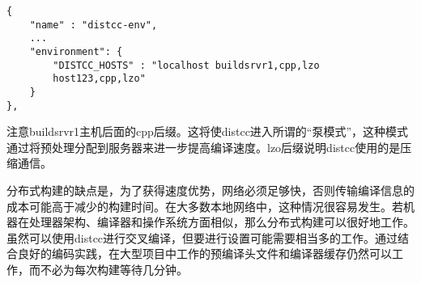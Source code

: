 \begin{lstlisting}[style=styleCMake]
{
	"name" : "distcc-env",
	...
	"environment": {
		"DISTCC_HOSTS" : "localhost buildsrvr1,cpp,lzo
		host123,cpp,lzo"
	}
},
\end{lstlisting}

注意buildsrvr1主机后面的cpp后缀。这将使distcc进入所谓的“泵模式”，这种模式通过将预处理分配到服务器来进一步提高编译速度。lzo后缀说明distcc使用的是压缩通信。

分布式构建的缺点是，为了获得速度优势，网络必须足够快，否则传输编译信息的成本可能高于减少的构建时间。在大多数本地网络中，这种情况很容易发生。若机器在处理器架构、编译器和操作系统方面相似，那么分布式构建可以很好地工作。虽然可以使用distcc进行交叉编译，但要进行设置可能需要相当多的工作。通过结合良好的编码实践，在大型项目中工作的预编译头文件和编译器缓存仍然可以工作，而不必为每次构建等待几分钟。










